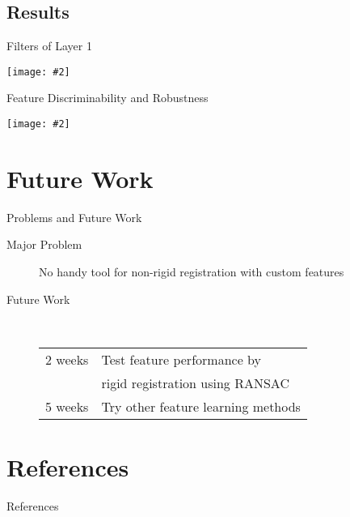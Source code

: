 \documentclass {beamer}
\newcommand{\addgraph}[2]{\begin{center}
\texttt{[image: \#2]}\end{center}}
\begin{document}
\subsection{Results}
\begin{frame}{Filters of Layer 1}
    \addgraph{0.6}{res/filter.png}
\end{frame}

\begin{frame}{Feature Discriminability and Robustness}
    \addgraph{0.7}{res/dist.png}
\end{frame}

\section{Future Work}
\begin{frame}{Problems and Future Work}
    \begin{description}
        \item[Major Problem] No handy tool for non-rigid registration with
            custom features
        \item[Future Work] \hspace{1em} \\
            \begin{tabular}{ll}
                2 weeks & Test feature performance by \\
                    & rigid registration using RANSAC \\
                5 weeks & Try other feature learning methods
            \end{tabular}
    \end{description}
\end{frame}


\section{ }
\subsection{ }

\section[]{References}
\begin{frame}[allowframebreaks]{References}
    \printbibliography
\end{frame}
\end{document}
